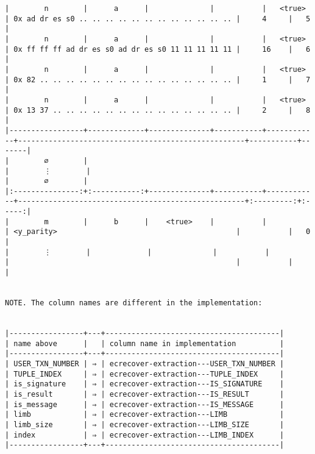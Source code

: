 \documentclass[varwidth=\maxdimen,margin=0.5cm,multi={verbatim}]{standalone}
\begin{document}
\begin{verbatim}
|        n        |      a      |              |           |   <true>   | 0x ad dr es s0 .. .. .. .. .. .. .. .. .. .. .. .. |     4     |   5   |
|        n        |      a      |              |           |   <true>   | 0x ff ff ff ad dr es s0 ad dr es s0 11 11 11 11 11 |     16    |   6   |
|        n        |      a      |              |           |   <true>   | 0x 82 .. .. .. .. .. .. .. .. .. .. .. .. .. .. .. |     1     |   7   |
|        n        |      a      |              |           |   <true>   | 0x 13 37 .. .. .. .. .. .. .. .. .. .. .. .. .. .. |     2     |   8   |
|-----------------+-------------+--------------+-----------+------------+----------------------------------------------------+-----------+-------|
|        ∅        |
|        ⋮        |
|        ∅        |
|:---------------:+:-----------:+--------------+-----------+------------+----------------------------------------------------+:---------:+:-----:|
|        m        |      b      |    <true>    |           |            | <y_parity>                                         |           |   0   |
|        ⋮        |             |              |           |            |                                                    |           |       |


NOTE. The column names are different in the implementation:


|-----------------+---+----------------------------------------|
| name above      |   | column name in implementation          |
|-----------------+---+----------------------------------------|
| USER_TXN_NUMBER | ⇒ | ecrecover-extraction---USER_TXN_NUMBER |
| TUPLE_INDEX     | ⇒ | ecrecover-extraction---TUPLE_INDEX     |
| is_signature    | ⇒ | ecrecover-extraction---IS_SIGNATURE    |
| is_result       | ⇒ | ecrecover-extraction---IS_RESULT       |
| is_message      | ⇒ | ecrecover-extraction---IS_MESSAGE      |
| limb            | ⇒ | ecrecover-extraction---LIMB            |
| limb_size       | ⇒ | ecrecover-extraction---LIMB_SIZE       |
| index           | ⇒ | ecrecover-extraction---LIMB_INDEX      |
|-----------------+---+----------------------------------------|


\end{verbatim}
\end{document}
